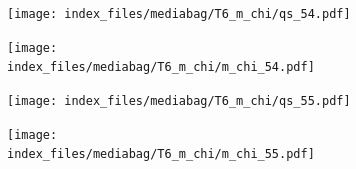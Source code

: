 \documentclass[
  11pt,
  letterpaper,
]{scrreprt}
\begin{document}
\begin{figure}

\begin{minipage}{0.50\linewidth}

\begin{figure}[H]

{\centering \texttt{[image: index\_files/mediabag/T6\_m\_chi/qs\_54.pdf]}

}


\end{figure}%

\end{minipage}%
%
\begin{minipage}{0.50\linewidth}

\begin{figure}[H]

{\centering \texttt{[image: index\_files/mediabag/T6\_m\_chi/m\_chi\_54.pdf]}

}


\end{figure}%

\end{minipage}%

\end{figure}%

\begin{figure}

\begin{minipage}{0.50\linewidth}

\begin{figure}[H]

{\centering \texttt{[image: index\_files/mediabag/T6\_m\_chi/qs\_55.pdf]}

}


\end{figure}%

\end{minipage}%
%
\begin{minipage}{0.50\linewidth}

\begin{figure}[H]

{\centering \texttt{[image: index\_files/mediabag/T6\_m\_chi/m\_chi\_55.pdf]}

}


\end{figure}%

\end{minipage}%

\end{figure}%
\end{document}
